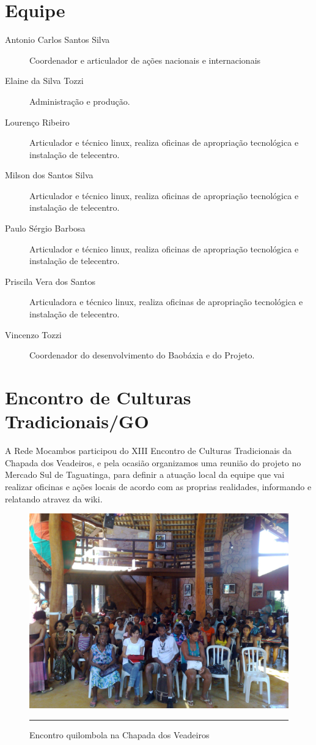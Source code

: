 \documentclass[a4paper, 11pt, oneside]{Relatorio_sem}  %
\begin{document}
\section{Equipe}

\begin{description}
\item[Antonio Carlos Santos Silva] Coordenador e articulador de ações nacionais e internacionais
\item[Elaine da Silva Tozzi] Administração e produção.
\item[Lourenço Ribeiro] Articulador e técnico linux, realiza oficinas de apropriação tecnológica e instalação de telecentro.
\item[Milson dos Santos Silva] Articulador e técnico linux, realiza oficinas de apropriação tecnológica e instalação de telecentro.
\item[Paulo Sérgio Barbosa]  Articulador e técnico linux, realiza oficinas de apropriação tecnológica e instalação de telecentro.
\item[Priscila Vera dos Santos] Articuladora e técnico linux, realiza oficinas de apropriação tecnológica e instalação de telecentro.
\item[Vincenzo Tozzi] Coordenador do desenvolvimento do Baobáxia e do Projeto. 
\end{description}

\section{Encontro de Culturas Tradicionais/GO}
A Rede Mocambos participou do XIII Encontro de Culturas Tradicionais
da Chapada dos Veadeiros, e pela ocasião organizamos uma reunião do
projeto no Mercado Sul de Taguatinga, para definir a atuação local da
equipe que vai realizar oficinas e ações locais de acordo com as
proprias realidades, informando e relatando atravez da wiki.

\begin{figure}[htbp]
  \centering
  \includegraphics[width=\textwidth]{./Fig/Rota_Kalungas_1.pdf}
  \rule{35em}{0.5pt}
  \caption[Encontro quilombola na Chapada dos Veadeiros]{Encontro quilombola na Chapada dos Veadeiros}
  \label{fig:EncontroKalungas}
\end{figure}
\end{document}
